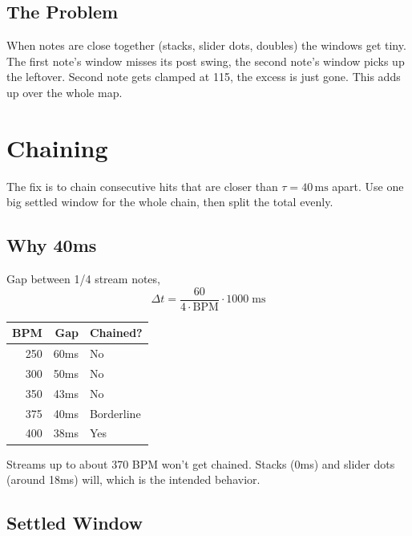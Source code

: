 \documentclass[11pt]{article}
\begin{document}
   \subsection{The Problem}

   When notes are close together (stacks, slider dots, doubles) the windows get
   tiny. The first note's window misses its post swing, the second note's window
   picks up the leftover. Second note gets clamped at 115, the excess is just
   gone. This adds up over the whole map.

   \section{Chaining}

   The fix is to chain consecutive hits that are closer than
   $\tau = 40\,\text{ms}$ apart. Use one big settled window for the whole chain,
   then split the total evenly.

   \subsection{Why 40ms}

   Gap between 1/4 stream notes,
   \[
      \Delta t = \frac{60}{4 \cdot \text{BPM}}\cdot 1000\;\text{ms}
   \]

   \begin{center}
      \renewcommand{\arraystretch}{1.2}
      \begin{tabular}{r r l}
         \hline
         BPM & Gap  & Chained?   \\
         \hline
         250 & 60ms & No         \\
         300 & 50ms & No         \\
         350 & 43ms & No         \\
         375 & 40ms & Borderline \\
         400 & 38ms & Yes        \\
         \hline
      \end{tabular}
   \end{center}

   Streams up to about 370 BPM won't get chained. Stacks (0ms) and slider dots (around
   18ms) will, which is the intended behavior.

   \subsection{Settled Window}
\end{document}
